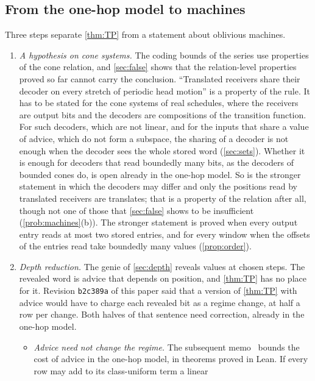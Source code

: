 \subsection{From the one-hop model to machines}\label{sec:to-machines}

Three steps separate \cref{thm:TP} from a statement about oblivious machines.
\begin{enumerate}[leftmargin=2em]
\item \emph{A hypothesis on cone systems.} The coding bounds of the series use properties of the cone relation, and
\cref{sec:false} shows that the relation-level properties proved so far cannot carry the conclusion. ``Translated receivers share their
decoder on every stretch of periodic head motion'' is a property of the rule. It has to be stated for the cone systems
of real schedules, where the receivers are output bits and the decoders are compositions of the transition function.
For such decoders, which are not linear, and for the inputs that share a value of advice, which do not form a
subspace, the sharing of a decoder is not enough when the decoder sees the whole stored word
(\cref{sec:sets}). Whether it is enough for decoders that read boundedly many bits, as the decoders of bounded cones
do, is open already in the one-hop model. So is the stronger statement in which the decoders may differ and only the
positions read by translated receivers are translates; that is a property of the relation after all, though not one
of those that \cref{sec:false} shows to be insufficient (\cref{prob:machines}(b)). The stronger statement is proved
when every output entry reads at most two stored entries, and for every window when the offsets of the entries read
take boundedly many values (\cref{prop:order}).
\item \emph{Depth reduction.} The genie of \cref{sec:depth} reveals values at chosen steps. The revealed word is advice
that depends on position, and \cref{thm:TP} has no place for it. Revision \texttt{b2c389a} of this paper said that a
version of \cref{thm:TP} with advice would have to charge each revealed bit as a regime change, at half a row per
change. Both halves of that sentence need correction, already in the one-hop model.
\begin{itemize}[leftmargin=1.5em]
\item \emph{Advice need not change the regime.} The subsequent memo~\cite{ClassUniformMemo2026} bounds the cost of
advice in the one-hop model, in theorems proved in Lean. If every row may add to its class-uniform term a linear

\end{itemize}
\end{enumerate}
